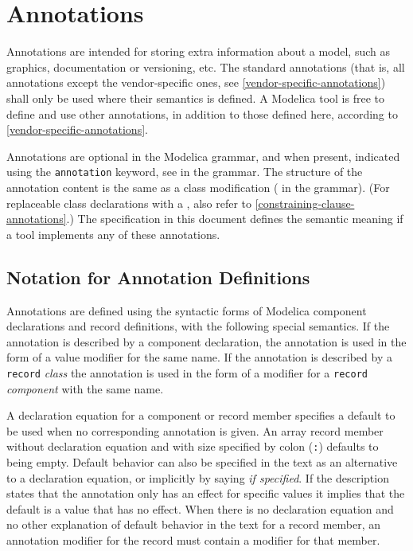 \chapter{Annotations}\label{annotations}

Annotations are intended for storing extra information about a model, such as graphics, documentation or versioning, etc.
The standard annotations (that is, all annotations except the vendor-specific ones, see \cref{vendor-specific-annotations}) shall only be used where their semantics is defined.
A Modelica tool is free to define and use other annotations, in addition to those defined here, according to \cref{vendor-specific-annotations}.

Annotations are optional in the Modelica grammar, and when present, indicated using the \lstinline!annotation! keyword, see  in the grammar.
The structure of the annotation content is the same as a class modification ( in the grammar).
(For replaceable class declarations with a , also refer to \cref{constraining-clause-annotations}.)
The specification in this document defines the semantic meaning if a tool implements any of these annotations.


\section{Notation for Annotation Definitions}\label{notation-for-annotation-definitions}

Annotations are defined using the syntactic forms of Modelica component declarations and record definitions, with the following special semantics.
If the annotation is described by a component declaration, the annotation is used in the form of a value modifier for the same name.
If the annotation is described by a \lstinline!record! \emph{class} the annotation is used in the form of a modifier for a \lstinline!record! \emph{component} with the same name.

A declaration equation for a component or record member specifies a default to be used when no corresponding annotation is given.
An array record member without declaration equation and with size specified by colon (\lstinline!:!) defaults to being empty.
Default behavior can also be specified in the text as an alternative to a declaration equation, or implicitly by saying \emph{if specified}.
If the description states that the annotation only has an effect for specific values it implies that the default is a value that has no effect.
When there is no declaration equation and no other explanation of default behavior in the text for a record member, an annotation modifier for the record must contain a modifier for that member.

